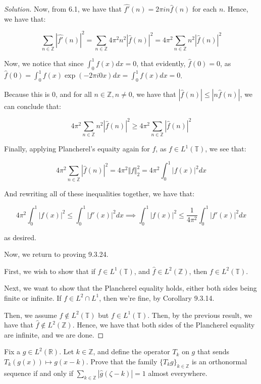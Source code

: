 \documentclass[10pt]{article}
\newenvironment{problem}[2][]{\begin{trivlist}
\item[\hskip \labelsep {\bfseries #1}\hskip \labelsep {\bfseries #2.}]}{\end{trivlist}}
\begin{document}
\begin{proof}[Solution]
Now, from 6.1, we have that $\hat{f'}(n) =  2\pi i n \hat{f}(n)$ for each $n$. Hence, we have that:

$$  \sum_{n \in \mathbb{Z}} | \hat{f'}(n)|^2 =  \sum_{n \in \mathbb{Z}} 4 \pi^2 n^2| \hat{f}(n)|^2 = 4 \pi^2 \sum_{n \in \mathbb{Z}} n^2| \hat{f}(n)|^2$$

Now, we notice that since $\int_0^1 f(x) dx = 0$, that evidently, $\hat{f}(0) = 0$, as $\hat{f}(0) = \int_0^1 f(x) \exp(-2\pi i 0 x) dx = \int_0^1 f(x) dx = 0$.

Because this is 0, and for all $n \in \mathbb{Z}, n \not = 0$, we have that $|\hat{f}(n)| \leq | n \hat{f}(n)|$, we can conclude that:

$$  4 \pi^2 \sum_{n \in \mathbb{Z}} n^2| \hat{f}(n)|^2 \geq 4 \pi^2 \sum_{n \in \mathbb{Z}} | \hat{f}(n) |^2 $$

Finally, applying Plancherel's equaity again for $f$, as $f \in L^1(\mathbb{T})$, we see that:

$$ 4 \pi^2 \sum_{n \in \mathbb{Z}} | \hat{f}(n) |^2  = 4 \pi^2 \Vert f \Vert_2^2 = 4 \pi^2 \int_0^1 |f(x)|^2 dx $$

And rewriting all of these inequalities together, we have that:

$$ 4\pi^2 \int_0^1 |f(x)|^2 \leq \int_0^1 |f'(x)|^2 dx \implies \int_0^1 |f(x)|^2 \leq \frac{1}{4\pi^2} \int_0^1 |f'(x)|^2 dx$$

as desired.

Now, we return to proving 9.3.24.

First, we wish to show that if $f \in L^1(\mathbb{T})$, and $\hat{f} \in L^2(\mathbb{Z})$, then $f \in L^2(\mathbb{T})$.


Next, we want to show that the Plancherel equality holds, either both sides being finite or infinite. If $f \in L^2 \cap L^1$, then we're fine, by Corollary 9.3.14.

Then, we assume $f \not \in L^2(\mathbb{T})$ but $f \in L^1(\mathbb{T})$. Then, by the previous result, we have that $\hat{f} \not \in L^2(\mathbb{Z})$. Hence, we have that both sides of the Plancherel equality are infinite, and we are done.




\end{proof}

\begin{problem}{Question 12}

Fix a $g \in L^2(\mathbb{R})$. Let $k \in \mathbb{Z}$, and define the operator $T_k$ on $g$ that sends $T_k (g(x)) \mapsto g(x - k)$. Prove that the family $\{ T_k g \}_{k \in \mathbb{Z}}$ is an orthonormal sequence if and only if $\sum_{k \in \mathbb{Z}} | \hat{g}(\zeta - k)| = 1$ almost everywhere.

\end{problem}
\end{document}

